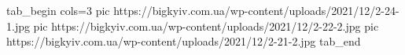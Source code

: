  
 
 
 
 

\ifcmt
  tab_begin cols=3
     pic https://bigkyiv.com.ua/wp-content/uploads/2021/12/2-24-1.jpg
     pic https://bigkyiv.com.ua/wp-content/uploads/2021/12/2-22-2.jpg
		 pic https://bigkyiv.com.ua/wp-content/uploads/2021/12/2-21-2.jpg
  tab_end
\fi
